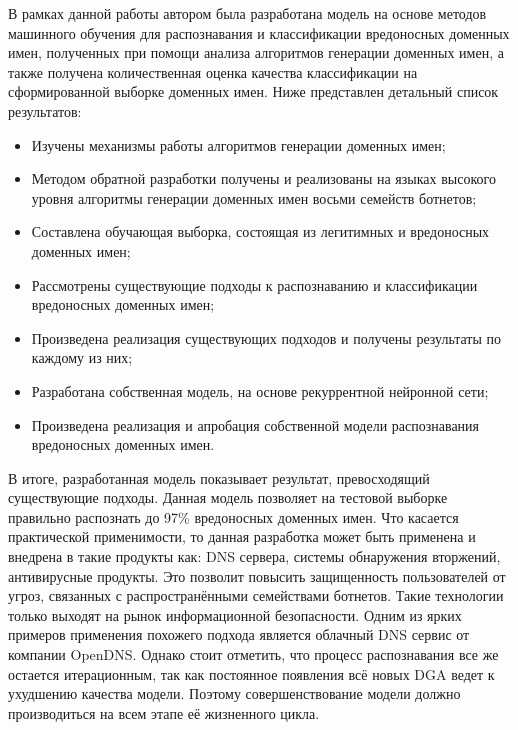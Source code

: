 В рамках данной работы автором была разработана модель на основе методов машинного обучения для распознавания и классификации вредоносных доменных имен, полученных при помощи анализа алгоритмов генерации доменных имен, а также получена количественная оценка качества классификации на сформированной выборке доменных имен. Ниже представлен детальный список результатов:
\begin{itemize}
\item Изучены механизмы работы алгоритмов генерации доменных имен;
\item Методом обратной разработки получены и реализованы на языках высокого уровня алгоритмы генерации доменных имен восьми семейств ботнетов;
\item Составлена обучающая выборка, состоящая из легитимных и вредоносных доменных имен;
\item Рассмотрены существующие подходы к распознаванию и классификации вредоносных доменных имен;
\item Произведена реализация существующих подходов и получены результаты по каждому из них;
\item Разработана собственная модель, на основе рекуррентной нейронной сети;
\item Произведена реализация и апробация собственной модели распознавания вредоносных доменных имен.
\end{itemize}

В итоге, разработанная модель показывает результат, превосходящий существующие подходы. Данная модель позволяет на тестовой выборке правильно распознать до 97\% вредоносных доменных имен.
Что касается практической применимости, то данная разработка может быть применена и внедрена в такие продукты как: DNS сервера, системы обнаружения вторжений, антивирусные продукты. Это позволит повысить защищенность пользователей от угроз, связанных с распространёнными семействами ботнетов. Такие технологии только выходят на рынок информационной безопасности. Одним из ярких примеров применения похожего подхода является облачный DNS сервис от компании OpenDNS. Однако стоит отметить, что процесс распознавания все же остается итерационным, так как постоянное появления всё новых DGA ведет к ухудшению качества модели. Поэтому совершенствование модели должно производиться на всем этапе её жизненного цикла.
\clearpage